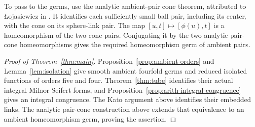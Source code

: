 To pass to the germs, use the analytic ambient-pair cone theorem,
attributed to \L{}ojasiewicz in
\cite[Theorem~1.4]{Massey2015LeCycles}. It identifies each sufficiently
small ball pair, including its center, with the cone on its
sphere-link pair. The map
$[u,t]\mapsto[\phi(u),t]$ is a homeomorphism of the two cone pairs.
Conjugating it by the two analytic pair-cone homeomorphisms gives
the required homeomorphism germ of ambient pairs.

\begin{proof}[Proof of Theorem~\ref{thm:main}]
Proposition~\ref{prop:ambient-orders} and Lemma~\ref{lem:isolation}
give smooth ambient fourfold germs and reduced isolated functions of
orders five and four. Theorem~\ref{thm:tube} identifies their actual
integral Milnor Seifert forms, and Proposition~\ref{prop:arith-integral-congruence}
gives an integral congruence. The Kato argument above identifies their
embedded links. The analytic pair-cone construction above extends that equivalence
to an ambient homeomorphism germ, proving the assertion.
\end{proof}
